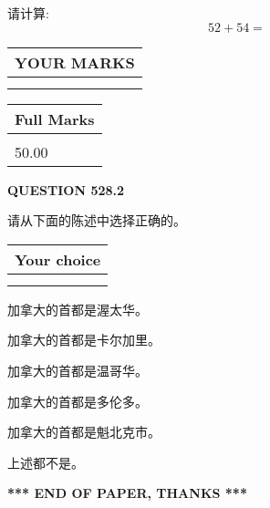 \documentclass{ctexart}
\begin{document}
  
 
请计算:
\begin{equation}
52 +  %
54 = \nonumber
\end{equation}
 

 

 
  
\vspace{0.2in}
  
\noindent\begin{tabular}{|l|}
\hline
 YOUR MARKS  \\
\hline
 \\ 
 \\ 
\hline
\end{tabular}
\hspace{0.05in} \begin{tabular}{|l|}
\hline
 Full Marks  \\
\hline
 \\ 
50.00 \\
\hline
\end{tabular}
{\textbf{\Large{QUESTION
528.2 
}}}
  
  
请从下面的陈述中选择正确的。
  
  
\noindent\hspace{3.0in} \begin{tabular}{|l|}
\hline
Your choice \\
\hline
 \\ 
 \\ 
\hline
\end{tabular}
  
  
 
 
加拿大的首都是渥太华。
 
 
加拿大的首都是卡尔加里。
 
 
加拿大的首都是温哥华。
 
 
加拿大的首都是多伦多。
 
 
加拿大的首都是魁北克市。
 
 
 上述都不是。
 
 
   
   
 \vspace{0.2in}
 
   
   
   
   
\vspace{1.0in} 
{\textbf{\large{ *** END OF PAPER, THANKS *** }}} 
   
\end{document}
